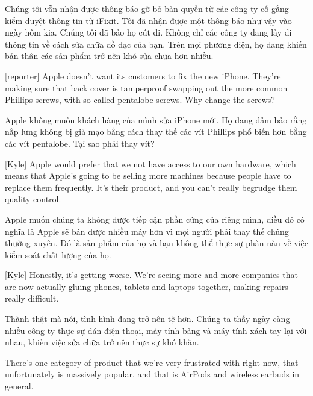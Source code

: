 \documentclass[a4paper]{article}
\begin{document}
	\begin{vietnamese-v2}
		Chúng tôi vẫn nhận được thông báo gỡ bỏ bản quyền từ các công ty cố gắng kiểm duyệt thông tin từ iFixit.
		Tôi đã nhận được một thông báo như vậy vào ngày hôm kia.
		Chúng tôi đã bảo họ cút đi.
		Không chỉ các công ty đang lấy đi thông tin về cách sửa chữa đồ đạc của bạn.
		Trên mọi phương diện, họ đang khiến bản thân các sản phẩm trở nên khó sửa chữa hơn nhiều.
	\end{vietnamese-v2}
	
	[reporter] Apple doesn't want its customers to fix the new iPhone.
	They're making sure that back cover is tamperproof swapping out the more common Phillips screws, with so-called pentalobe screws.
	Why change the screws?
	
	\begin{vietnamese-v2}
		 Apple không muốn khách hàng của mình sửa iPhone mới.
		Họ đang đảm bảo rằng nắp lưng không bị giả mạo bằng cách thay thế các vít Phillips phổ biến hơn bằng các vít pentalobe.
		Tại sao phải thay vít?
	\end{vietnamese-v2}
	
	[Kyle] Apple would prefer that we not have access to our own hardware, which means that Apple's going to be selling more machines because people have to replace them frequently. It's their product, and you can't really begrudge them quality control.
	
	\begin{vietnamese-v2}
		[Kyle] Apple muốn chúng ta không được tiếp cận phần cứng của riêng mình, điều đó có nghĩa là Apple sẽ bán được nhiều máy hơn vì mọi người phải thay thế chúng thường xuyên. Đó là sản phẩm của họ và bạn không thể thực sự phàn nàn về việc kiểm soát chất lượng của họ.
	\end{vietnamese-v2}
	
	[Kyle] Honestly, it's getting worse. We're seeing more and more companies that are now actually gluing phones, tablets and laptops together, making repairs really difficult.
	
	\begin{vietnamese-v2}
		[Kyle] Thành thật mà nói, tình hình đang trở nên tệ hơn. Chúng ta thấy ngày càng nhiều công ty thực sự dán điện thoại, máy tính bảng và máy tính xách tay lại với nhau, khiến việc sửa chữa trở nên thực sự khó khăn.
	\end{vietnamese-v2}
	
	There's one category of product that we're very frustrated with right now, that unfortunately is massively popular, and that is AirPods and wireless earbuds in general.
	
\end{document}

